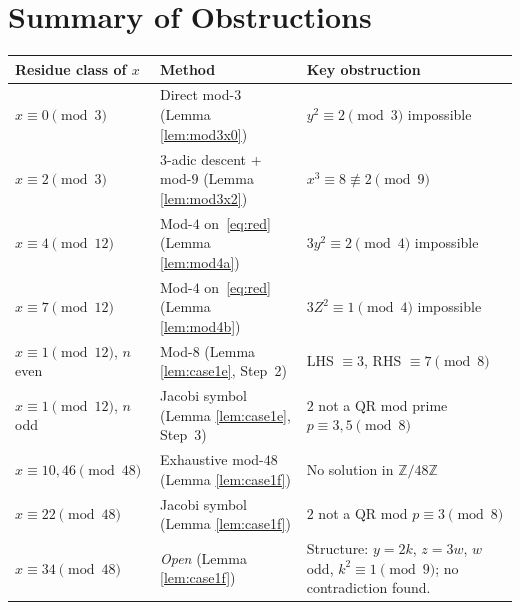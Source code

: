 \documentclass[12pt, a4paper]{amsart}
\theoremstyle{plain}
\theoremstyle{definition}
\begin{document}
\section{Summary of Obstructions}

\begin{center}
\renewcommand{\arraystretch}{1.25}
\begin{tabular}{p{3.2cm}p{5.2cm}p{5.6cm}}
\toprule
Residue class of $x$ & Method & Key obstruction \\
\midrule
$x \equiv 0 \pmod{3}$
  & Direct mod-$3$ (Lemma \ref{lem:mod3x0})
  & $y^2 \equiv 2 \pmod{3}$ impossible \\
$x \equiv 2 \pmod{3}$
  & 3-adic descent + mod-$9$ (Lemma \ref{lem:mod3x2})
  & $x^3 \equiv 8 \not\equiv 2 \pmod{9}$ \\
$x \equiv 4 \pmod{12}$
  & Mod-$4$ on~\eqref{eq:red} (Lemma \ref{lem:mod4a})
  & $3y^2 \equiv 2 \pmod{4}$ impossible \\
$x \equiv 7 \pmod{12}$
  & Mod-$4$ on~\eqref{eq:red} (Lemma \ref{lem:mod4b})
  & $3Z^2 \equiv 1 \pmod{4}$ impossible \\
$x \equiv 1 \pmod{12}$, $n$ even
  & Mod-$8$ (Lemma \ref{lem:case1e}, Step~2)
  & LHS $\equiv 3$, RHS $\equiv 7 \pmod{8}$ \\
$x \equiv 1 \pmod{12}$, $n$ odd
  & Jacobi symbol (Lemma \ref{lem:case1e}, Step~3)
  & $2$ not a QR mod prime $p \equiv 3,5 \pmod{8}$ \\
$x \equiv 10,46 \pmod{48}$
  & Exhaustive mod-$48$ (Lemma \ref{lem:case1f})
  & No solution in $\mathbb{Z}/48\mathbb{Z}$ \\
$x \equiv 22 \pmod{48}$
  & Jacobi symbol (Lemma \ref{lem:case1f})
  & $2$ not a QR mod $p \equiv 3 \pmod{8}$ \\
$x \equiv 34 \pmod{48}$
  & \emph{Open} (Lemma \ref{lem:case1f})
  & Structure: $y=2k$, $z=3w$, $w$ odd, $k^2\equiv 1\pmod{9}$;
    no contradiction found. \\
\bottomrule
\end{tabular}
\end{center}
\end{document}
